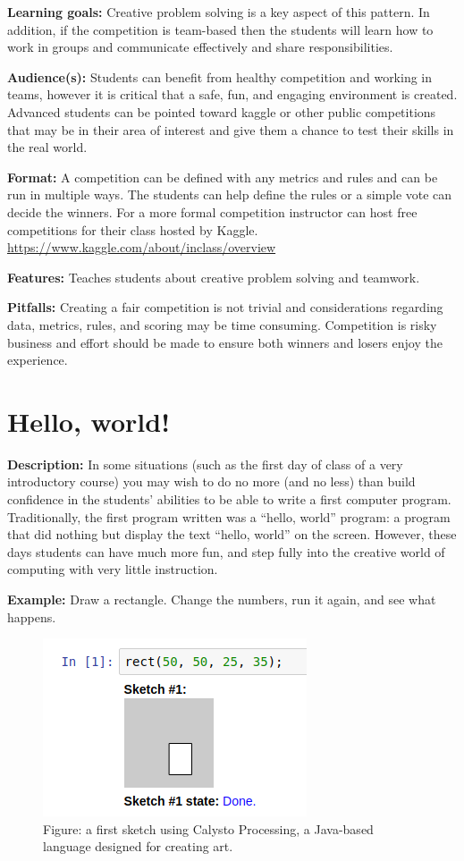 \documentclass[]{book}
\begin{document}
\textbf{Learning goals:}
Creative problem solving is a key aspect of this pattern. In addition, if the
competition is team-based then the students will learn how to work in groups
and communicate effectively and share responsibilities.

\textbf{Audience(s):}
Students can benefit from healthy competition and working in teams, however it
is critical that a safe, fun, and engaging environment is created. Advanced
students can be pointed toward kaggle or other public competitions that may be
in their area of interest and give them a chance to test their skills in the
real world.

\textbf{Format:}
A competition can be defined with any metrics and rules and can be run in
multiple ways. The students can help define the rules or a simple vote can
decide the winners. For a more formal competition instructor can host free
competitions for their class hosted by Kaggle.
\url{https://www.kaggle.com/about/inclass/overview}

\textbf{Features:}
Teaches students about creative problem solving and teamwork.

\textbf{Pitfalls:}
Creating a fair competition is not trivial and considerations regarding data,
metrics, rules, and scoring may be time consuming. Competition is risky
business and effort should be made to ensure both winners and losers enjoy the
experience.

\hypertarget{hello-world}{%
\section{Hello, world!}\label{hello-world}}

\textbf{Description:}
In some situations (such as the first day of class of a very introductory course)
you may wish to do no more (and no less) than build confidence in the students'
abilities to be able to write a first computer program. Traditionally, the first
program written was a ``hello, world'' program: a program that did nothing but display
the text ``hello, world'' on the screen. However, these days students can have much more fun,
and step fully into the creative world of computing with very little instruction.

\textbf{Example:}
Draw a rectangle. Change the numbers, run it again, and see what happens.

\begin{figure}
\centering
\includegraphics{images/processing.png}
\caption{Figure: a first sketch using Calysto Processing, a Java-based language designed for creating art.}
\end{figure}
\end{document}
